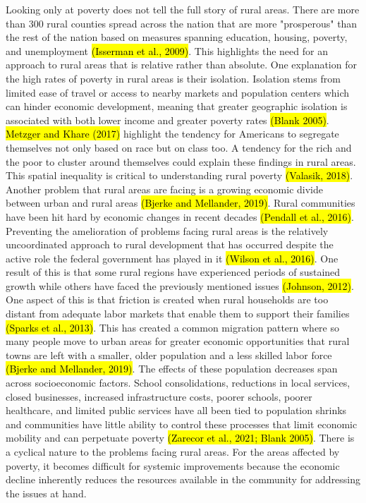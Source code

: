 Looking only at poverty does not tell the full story of rural areas. There are more than 300 rural counties spread across the nation that are more "prosperous" than the rest of the nation based on measures spanning education, housing, poverty, and unemployment \hl{(Isserman et al., 2009)}.  This highlights the need for an approach to rural areas that is relative rather than absolute. One explanation for the high rates of poverty in rural areas is their isolation. Isolation stems from limited ease of travel or access to nearby markets and population centers which can hinder economic development, meaning that greater geographic isolation is associated with both lower income and greater poverty rates \hl{(Blank 2005)}. \hl{Metzger and Khare (2017)} highlight the tendency for Americans to segregate themselves not only based on race but on class too. A tendency for the rich and the poor to cluster around themselves could explain these findings in rural areas. This spatial inequality is critical to understanding rural poverty \hl{(Valasik, 2018)}. Another problem that rural areas are facing is a growing economic divide between urban and rural areas \hl{(Bjerke and Mellander, 2019)}.  Rural communities have been hit hard by economic changes in recent decades \hl{(Pendall et al., 2016)}. Preventing the amelioration of problems facing rural areas is the relatively uncoordinated approach to rural development that has occurred despite the active role the federal government has played in it \hl{(Wilson et al., 2016)}. One result of this is that some rural regions have experienced periods of sustained growth while others have faced the previously mentioned issues \hl{(Johnson, 2012)}. One aspect of this is that friction is created when rural households are too distant from adequate labor markets that enable them to support their families \hl{(Sparks et al., 2013)}. This has created a common migration pattern where so many people move to urban areas for greater economic opportunities that rural towns are left with a smaller, older population and a less skilled labor force \hl{(Bjerke and Mellander, 2019)}. The effects of these population decreases span across socioeconomic factors. School consolidations, reductions in local services, closed businesses, increased infrastructure costs, poorer schools, poorer healthcare, and limited public services have all been tied to population shrinks and communities have little ability to control these processes that limit economic mobility and can perpetuate poverty \hl{(Zarecor et al., 2021; Blank 2005)}. There is a cyclical nature to the problems facing rural areas. For the areas affected by poverty, it becomes difficult for systemic improvements because the economic decline inherently reduces the resources available in the community for addressing the issues at hand.


